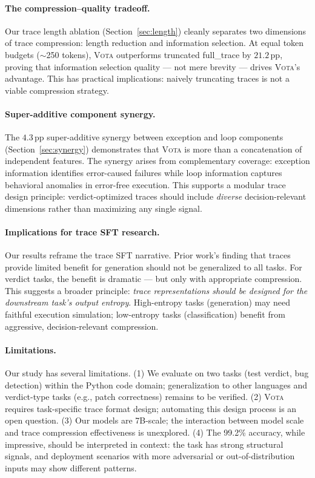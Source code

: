 \documentclass[11pt,a4paper]{article}
\newcommand{\vota}{\textsc{Vota}}
\newcommand{\pp}{\,\text{pp}}
\begin{document}
\paragraph{The compression--quality tradeoff.}
Our trace length ablation (Section~\ref{sec:length}) cleanly separates two dimensions of trace compression: length reduction and information selection.
At equal token budgets ($\sim$250 tokens), \vota{} outperforms truncated full\_trace by $21.2\pp$, proving that information selection quality --- not mere brevity --- drives \vota{}'s advantage.
This has practical implications: naively truncating traces is not a viable compression strategy.

\paragraph{Super-additive component synergy.}
The $4.3\pp$ super-additive synergy between exception and loop components (Section~\ref{sec:synergy}) demonstrates that \vota{} is more than a concatenation of independent features.
The synergy arises from complementary coverage: exception information identifies error-caused failures while loop information captures behavioral anomalies in error-free execution.
This supports a modular trace design principle: verdict-optimized traces should include \emph{diverse} decision-relevant dimensions rather than maximizing any single signal.

\paragraph{Implications for trace SFT research.}
Our results reframe the trace SFT narrative.
Prior work's finding that traces provide limited benefit for generation should not be generalized to all tasks.
For verdict tasks, the benefit is dramatic --- but only with appropriate compression.
This suggests a broader principle: \emph{trace representations should be designed for the downstream task's output entropy}.
High-entropy tasks (generation) may need faithful execution simulation; low-entropy tasks (classification) benefit from aggressive, decision-relevant compression.

\paragraph{Limitations.}
Our study has several limitations.
(1) We evaluate on two tasks (test verdict, bug detection) within the Python code domain; generalization to other languages and verdict-type tasks (e.g., patch correctness) remains to be verified.
(2) \vota{} requires task-specific trace format design; automating this design process is an open question.
(3) Our models are 7B-scale; the interaction between model scale and trace compression effectiveness is unexplored.
(4) The 99.2\% accuracy, while impressive, should be interpreted in context: the task has strong structural signals, and deployment scenarios with more adversarial or out-of-distribution inputs may show different patterns.
\end{document}
